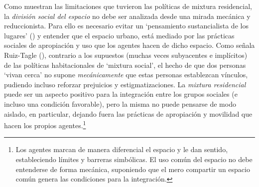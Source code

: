 \documentclass[
  spanish,
  a4paper,%
  chapterprefix=true,%
  DIV=calc,%
  twoside]{scrbook}%
\begin{document}
Como muestran las limitaciones que tuvieron las políticas de mixtura
residencial, la \emph{división social del espacio} no debe ser analizada
desde una mirada mecánica y reduccionista. Para ello es necesario evitar
un `pensamiento sustancialista de los lugares' () y
entender que el espacio urbano, está mediado por las prácticas sociales
de apropiación y uso que los agentes hacen de dicho espacio. Como señala
Ruiz-Tagle (), contrario a los supuestos (muchas veces subyacentes e
implícitos) de las políticas habitacionales de `mixtura social', el
hecho de que dos personas `vivan cerca' no supone \emph{mecánicamente} que
estas personas establezcan vínculos, pudiendo incluso reforzar
prejuicios y estigmatizaciones. La \emph{mixtura residencial} puede ser un
aspecto positivo para la integración entre los grupos sociales (e
incluso una condición favorable), pero la misma no puede pensarse de
modo aislado, en particular, dejando fuera las prácticas de apropiación
y movilidad que hacen los propios agentes.\footnote{Los agentes marcan de manera diferencial el espacio
  y le dan sentido, estableciendo límites y barreras simbólicas. El
  uso común del espacio no debe entenderse de forma mecánica,
  suponiendo que el mero compartir un espacio común genera las
  condiciones para la integración.}
\end{document}

